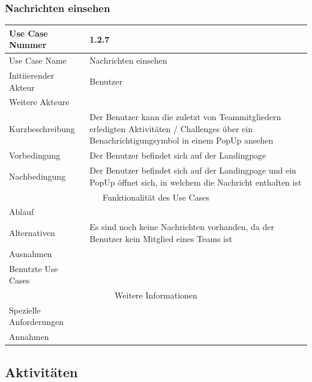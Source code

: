 \documentclass[10pt,a4paper]{article}
\begin{document}
		\subsubsection{Nachrichten einsehen}
		\begin{tabularx}{\textwidth}{|l|X|}
			\hline Use Case Nummer & 1.2.7 \\ 
			\hline Use Case Name & Nachrichten einsehen \\ 
			\hline Initiierender Akteur & Benutzer \\
			\hline Weitere Akteure & \\
			\hline Kurzbeschreibung & Der Benutzer kann die zuletzt von Teammitgliedern erledigten Aktivitäten / Challenges über ein Benachrichtigungsymbol in einem PopUp ansehen \\
			\hline Vorbedingung & Der Benutzer befindet sich auf der Landingpage \\
			\hline Nachbedingung & Der Benutzer befindet sich auf der Landingpage und ein PopUp öffnet sich, in welchem die Nachricht enthalten ist \\
			\hline \multicolumn{2}{|c|}{Funktionalität des Use Cases}\\
			\hline Ablauf & \\
			\hline Alternativen & Es sind noch keine Nachrichten vorhanden, da der Benutzer kein Mitglied eines Teams ist \\
			\hline Ausnahmen & \\
			\hline Benutzte Use Cases & \\
			\hline \multicolumn{2}{|c|}{Weitere Informationen} \\
			\hline Spezielle Anforderungen & \\
			\hline Annahmen & \\
			\hline
		\end{tabularx}
\subsection{Aktivit\"aten}
\end{document}
